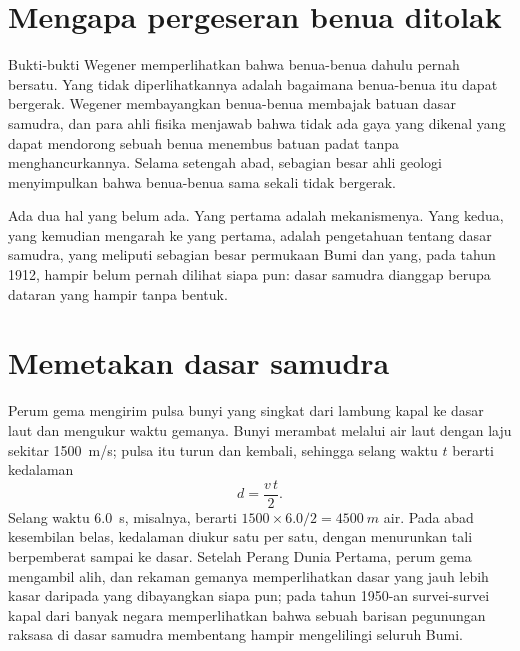 \section{Mengapa pergeseran benua ditolak}

Bukti-bukti Wegener memperlihatkan bahwa benua-benua dahulu pernah bersatu.
Yang tidak diperlihatkannya adalah bagaimana benua-benua itu dapat bergerak.
Wegener membayangkan benua-benua membajak batuan dasar samudra, dan para ahli
fisika menjawab bahwa tidak ada gaya yang dikenal yang dapat mendorong sebuah
benua menembus batuan padat tanpa menghancurkannya. Selama setengah abad,
sebagian besar ahli geologi menyimpulkan bahwa benua-benua sama sekali tidak
bergerak.

Ada dua hal yang belum ada. Yang pertama adalah mekanismenya. Yang kedua, yang
kemudian mengarah ke yang pertama, adalah pengetahuan tentang dasar samudra,
yang meliputi sebagian besar permukaan Bumi dan yang, pada tahun 1912, hampir
belum pernah dilihat siapa pun: dasar samudra dianggap berupa dataran yang
hampir tanpa bentuk.

\section{Memetakan dasar samudra}

Perum gema mengirim pulsa bunyi yang singkat dari lambung kapal ke dasar laut
dan mengukur waktu gemanya. Bunyi merambat melalui air laut dengan laju
sekitar \qty{1500}{m/s}; pulsa itu turun dan kembali, sehingga selang waktu $t$
berarti kedalaman
\[
  d = \frac{v\,t}{2}.
\]
Selang waktu \qty{6.0}{s}, misalnya, berarti $1500 \times 6.0/2 =
\qty{4500}{m}$ air. Pada abad kesembilan belas, kedalaman diukur satu per satu,
dengan menurunkan tali berpemberat sampai ke dasar. Setelah Perang Dunia
Pertama, perum gema mengambil alih, dan rekaman gemanya memperlihatkan dasar
yang jauh lebih kasar daripada yang dibayangkan siapa pun; pada tahun 1950-an
survei-survei kapal dari banyak negara memperlihatkan bahwa sebuah barisan
pegunungan raksasa di dasar samudra membentang hampir mengelilingi seluruh
Bumi.

